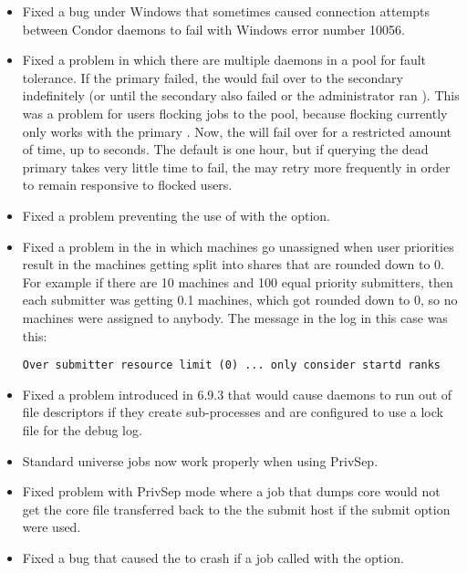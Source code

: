 \begin{itemize}
\item Fixed a bug under Windows that sometimes caused connection attempts
  between Condor daemons to fail with Windows error number 10056.

\item Fixed a problem in which there are multiple 
   daemons in a pool
  for fault tolerance.  If the primary  failed, the
   would fail over to the secondary 
  indefinitely (or until the secondary  also failed or the
  administrator ran ).  This was a problem for users
  flocking jobs to the pool, because flocking currently only works with
  the primary .  Now, the  will fail over
  for a restricted amount of time, up to
   seconds.  The default
  is one hour, but if querying the dead primary 
  takes very little
  time to fail, the  may retry more frequently
  in order to remain
  responsive to flocked users.

\item Fixed a problem preventing the use of  
  with the  option.

\item Fixed a problem in the  in which machines go
  unassigned when user priorities result in the machines getting split
  into shares that are rounded down to 0.  For example if there are 10
  machines and 100 equal priority submitters, then each submitter was
  getting 0.1 machines, which got rounded down to 0, so no machines were
  assigned to anybody.  The message in the  log in this case
  was this:

\footnotesize
\begin{verbatim}
Over submitter resource limit (0) ... only consider startd ranks
\end{verbatim}
\normalsize

\item Fixed a problem introduced in 6.9.3 that would cause daemons to
  run out of file descriptors if they create sub-processes and are
  configured to use a lock file for the debug log.

\item Standard universe jobs now work properly when using PrivSep.

\item Fixed problem with PrivSep mode where a job that dumps core would
  not get the core file transferred back to the the submit host if the
   submit option were used.

\item Fixed a bug that caused the  to crash if a job
called  with the  option.

\end{itemize}

